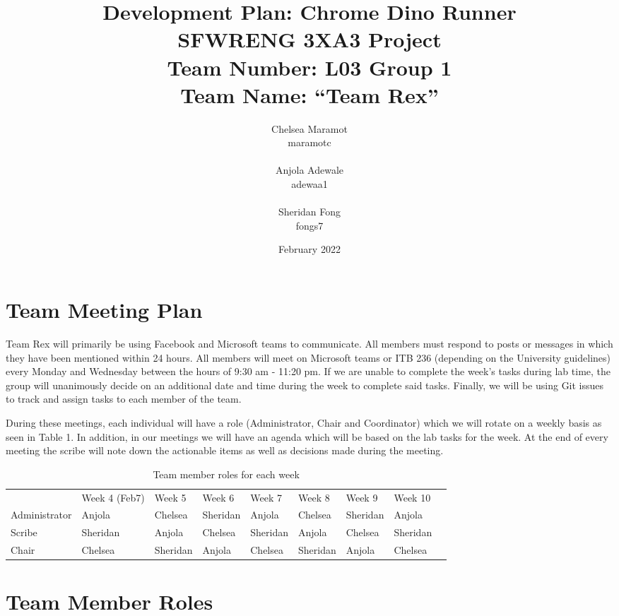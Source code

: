 \documentclass{article}
\title{Development Plan: Chrome Dino Runner \\ \bigskip \large SFWRENG 3XA3 Project \\ \bigskip \large Team Number: L03 Group 1 \\ \large Team Name: ``Team Rex'' }
\author{Chelsea Maramot \\ maramotc \\ \\ Anjola Adewale \\ adewaa1 \\ \\ Sheridan Fong \\ fongs7 }
\date{February 2022}
\begin{document}
	
	\maketitle
	
	
	\section{Team Meeting Plan}
	
   Team Rex will primarily be using Facebook and Microsoft teams to communicate.
   All members must respond to posts or messages in which they have been mentioned within 24 hours. 
   All members will meet on Microsoft teams or ITB 236 (depending on the University guidelines) every Monday and Wednesday between the hours of 9:30 am - 11:20 pm. 
   If we are unable to complete the week’s tasks during lab time, the group will unanimously decide on an additional date and time during the week to complete said tasks.
   Finally, we will be using Git issues to track and assign tasks to each member of the team.
   
During these meetings, each individual will have a role (Administrator, Chair and Coordinator) which we will rotate on a weekly basis as seen in Table 1. 
In addition, in our meetings we will have an agenda which will be based on the lab tasks for the week. 
At the end of every meeting the scribe will note down the actionable items as well as decisions made during the meeting.

	
	\begin{table}[h]
		\caption{Team member roles for each week}
		\begin{tabular}{|l|l|l|l|l|l|l|l|l}
			
		\cline{1-8}
					& Week 4 (Feb7) & Week 5   & Week 6   & Week 7   & Week 8   & Week 9   & Week 10  &  \\ \cline{1-8}
		Administrator & Anjola        & Chelsea  & Sheridan & Anjola   & Chelsea  & Sheridan & Anjola   &  \\ \cline{1-8}
		Scribe        & Sheridan      & Anjola   & Chelsea  & Sheridan & Anjola   & Chelsea  & Sheridan &  \\ \cline{1-8}
		Chair         & Chelsea       & Sheridan & Anjola   & Chelsea  & Sheridan & Anjola   & Chelsea  &  \\ \cline{1-8}
		\end{tabular}
	
	\end{table}

	\section{Team Member Roles}
	
\end{document}
